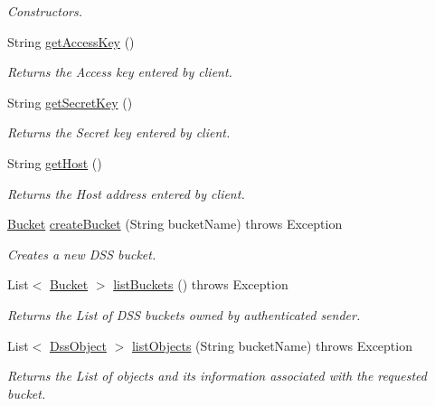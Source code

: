 \begin{DoxyCompactItemize}
\begin{DoxyCompactList}\small\item\em Constructors. \end{DoxyCompactList}\item 
String \hyperlink{classorg_1_1jcs_1_1dss_1_1main_1_1DssConnection_ac34701849b27b9041fd2d584caa9f074}{get\+Access\+Key} ()
\begin{DoxyCompactList}\small\item\em Returns the Access key entered by client. \end{DoxyCompactList}\item 
String \hyperlink{classorg_1_1jcs_1_1dss_1_1main_1_1DssConnection_a3e8946bf410e45e74da79b5c34baedb5}{get\+Secret\+Key} ()
\begin{DoxyCompactList}\small\item\em Returns the Secret key entered by client. \end{DoxyCompactList}\item 
String \hyperlink{classorg_1_1jcs_1_1dss_1_1main_1_1DssConnection_a441d432bf7f7da98d36285b5049d90db}{get\+Host} ()
\begin{DoxyCompactList}\small\item\em Returns the Host address entered by client. \end{DoxyCompactList}\item 
\hyperlink{classorg_1_1jcs_1_1dss_1_1main_1_1Bucket}{Bucket} \hyperlink{classorg_1_1jcs_1_1dss_1_1main_1_1DssConnection_ad67678e6ac4fd6b11cab125c81643f37}{create\+Bucket} (String bucket\+Name)  throws Exception 
\begin{DoxyCompactList}\small\item\em Creates a new D\+SS bucket. \end{DoxyCompactList}\item 
List$<$ \hyperlink{classorg_1_1jcs_1_1dss_1_1main_1_1Bucket}{Bucket} $>$ \hyperlink{classorg_1_1jcs_1_1dss_1_1main_1_1DssConnection_ac454ec0fb13b6a8e7e01addbc9255216}{list\+Buckets} ()  throws Exception 
\begin{DoxyCompactList}\small\item\em Returns the List of D\+SS buckets owned by authenticated sender. \end{DoxyCompactList}\item 
List$<$ \hyperlink{classorg_1_1jcs_1_1dss_1_1main_1_1DssObject}{Dss\+Object} $>$ \hyperlink{classorg_1_1jcs_1_1dss_1_1main_1_1DssConnection_a6b2c8f94a1c223779999361cfa4d2305}{list\+Objects} (String bucket\+Name)  throws Exception 
\begin{DoxyCompactList}\small\item\em Returns the List of objects and its information associated with the requested bucket. \end{DoxyCompactList}\item 

\end{DoxyCompactItemize}
